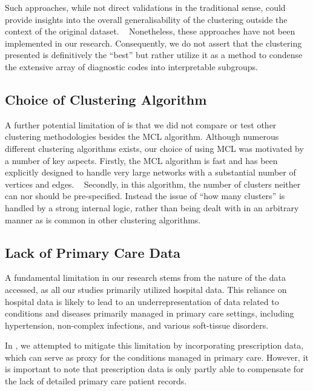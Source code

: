 Such approaches, while not direct validations in the traditional sense, 
could provide insights into the overall generalisability of the clustering 
outside the context of the original dataset.
~\autocite{ullmannValidation2022}
Nonetheless, these approaches have not been implemented in our research.
Consequently, we do not assert that the clustering presented is definitively
the \enquote{best} but rather utilize it as a method to condense the extensive
array of diagnostic codes into interpretable subgroups.

\subsection{Choice of Clustering Algorithm}

A further potential limitation of \studyi{} 
is that we did not compare or test other 
clustering methodologies besides the \ac{MCL} algorithm.
Although numerous different clustering algorithms exists,
our choice of using \ac{MCL} was motivated by a number of key aspects.
Firstly, the \ac{MCL} algorithm is fast and has been explicitly designed 
to handle very large networks with a substantial number of vertices
and edges.
~\autocite{vandongenGraph2008}
Secondly, in this algorithm,
the number of clusters neither can nor should be pre-specified.
Instead the issue of \enquote{how many clusters} is handled
by a strong internal logic, rather than being dealt with in an
arbitrary manner as is common in other clustering algorithms.
~\autocite{vandongenGraph2008}

\subsection{Lack of Primary Care Data}

A fundamental limitation in our research stems from the nature of the data
accessed, as all our studies primarily utilized hospital data. This
reliance on hospital data is likely to lead to an underrepresentation 
of data related to conditions and diseases primarily managed in primary
care settings, including hypertension, non-complex infections, and various
soft-tissue disorders.
~\autocite{finleyWhat2018} 

In \studyiii{}, we attempted to mitigate this limitation by incorporating
prescription data, which can serve as proxy for the conditions managed
in primary care.
However, it is important to note that prescription data is only partly
able to compensate for the lack of detailed primary care patient records.

